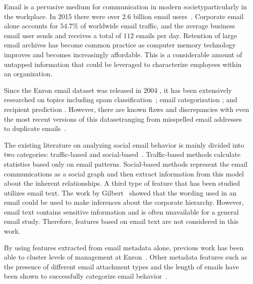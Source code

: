 \documentclass[10pt,twocolumn,conference]{IEEEtran}
\begin{document}
Email is a pervasive medium for communication in modern society\textemdash{}particularly in the workplace.
In 2015 there were over $2.6$ billion email users~\cite{radicati_emails_2015}.
Corporate email alone accounts for $54.7\%$ of worldwide email traffic, and the average business email user sends and receives a total of $112$ emails per day.
Retention of large email archives has become common practice as computer memory technology improves and becomes increasingly affordable.
This is a considerable amount of untapped information that could be leveraged to characterize employees within an organization.

Since the Enron email dataset was released in 2004 \cite{klimt_introducing_2004}, it has been extensively researched on topics including spam classification~\cite{martin_analyzing_2005}; email categorization \cite{he_novel_2014}; and recipient prediction \cite{sofershtein_predicting_2015}.
However, there are known flaws and discrepancies with even the most recent versions of this dataset\textemdash{}ranging from misspelled email addresses~\cite{nordbo_data_2014} to duplicate emails~\cite{waterman_big_2014}.

The existing literature on analyzing social email behavior is mainly divided into two categories: traffic-based and social-based~\cite{tang_email_2013}.
Traffic-based methods calculate statistics based only on email patterns.
Social-based methods represent the email communications as a social graph and then extract information from this model about the inherent relationships.
A third type of feature that has been studied utilizes email text.
The work by Gilbert~\cite{gilbert2012phrases} showed that the wording used in an email could be used to make inferences about the corporate hierarchy.
However, email text contains sensitive information and is often unavailable for a general email study.
Therefore, features based on email text are not considered in this work.

By using features extracted from email metadata alone, previous work has been able to cluster levels of management at Enron~\cite{yelupula_social_2008}.
Other metadata features such as the presence of different email attachment types and the length of emails have been shown to successfully categorize email behavior~\cite{martin_analyzing_2005}.
\end{document}
